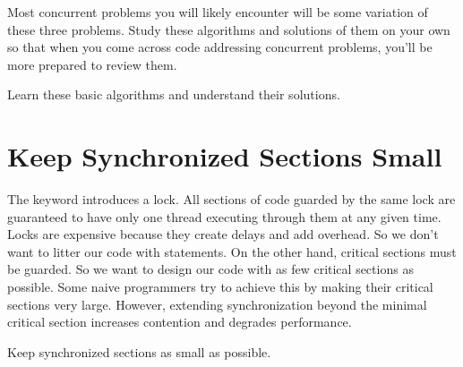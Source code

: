 Most concurrent problems you will likely encounter will be some variation of these three problems. Study these algorithms and solutions of them on your own so
that when you come across code addressing concurrent problems, you'll be more prepared to review them.

\begin{marker}
Learn these basic algorithms and understand their solutions.
\end{marker}

\section{Keep Synchronized Sections Small}

The  keyword introduces a lock. All sections of code guarded by the same lock are guaranteed to have only one thread executing through them at any given time. Locks are expensive because they create delays and add overhead. So we don't want to litter our code with  statements. On the other hand, critical sections must be guarded. So we want to design our code with as few critical sections as possible. Some naive programmers try to achieve this by making their critical sections very large. However, extending synchronization beyond the minimal critical section increases contention and degrades performance.

\begin{marker}
Keep synchronized sections as small as possible.
\end{marker}
